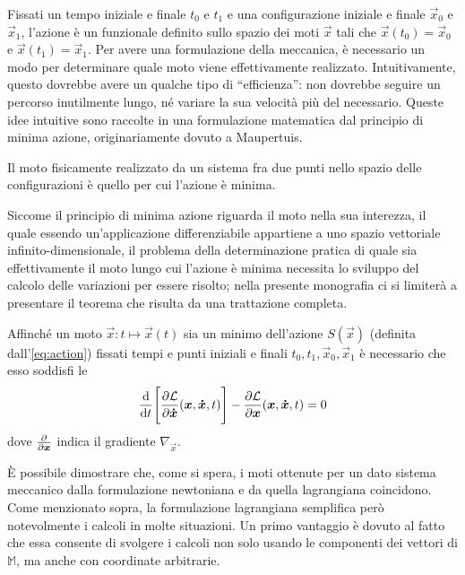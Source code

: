 Fissati un tempo iniziale e finale $t_0$ e $t_1$ e una configurazione iniziale e finale $\vec{x}_0$ e $\vec{x}_1$, l'azione è un funzionale definito sullo spazio dei moti $\vec{x}$ tali che $\vec{x}(t_0) = \vec{x}_0$ e $\vec{x}(t_1)=\vec{x}_1$. Per avere una formulazione della meccanica, è necessario un modo per determinare quale moto viene effettivamente realizzato. Intuitivamente, questo dovrebbe avere un qualche tipo di \textquotedblleft efficienza\textquotedblright: non dovrebbe seguire un percorso inutilmente lungo, né variare la sua velocità più del necessario. Queste idee intuitive sono raccolte in una formulazione matematica dal principio di minima azione, originariamente dovuto a Maupertuis.
\begin{minaction}
Il moto fisicamente realizzato da un sistema fra due punti nello spazio delle configurazioni è quello per cui l'azione è minima.
\end{minaction}
Siccome il principio di minima azione riguarda il moto nella sua interezza, il quale essendo un'applicazione differenziabile appartiene a uno spazio vettoriale infinito-dimensionale, il problema della determinazione pratica di quale sia effettivamente il moto lungo cui l'azione è minima necessita lo sviluppo del calcolo delle variazioni per essere risolto; nella presente monografia ci si limiterà a presentare il teorema che risulta da una trattazione completa.
\begin{theorem}
  Affinché un moto $\vec{x}: t\mapsto \vec{x}(t)$ sia un minimo dell'azione $S(\vec{x})$ (definita dall'\autoref{eq:action}) fissati tempi e punti iniziali e finali $t_0, t_1, \vec{x}_0, \vec{x}_1$ è necessario che esso soddisfi le  \begin{equation}
    \dv{t}\Bigg[\pdv{\mathcal{L}}{\boldsymbol{\dot{x}}}()(\boldsymbol{x}, \boldsymbol{\dot{x}}, t)\Bigg] - \pdv{\mathcal{L}}{\boldsymbol{x}}()(\boldsymbol{x}, \boldsymbol{\dot{x}}, t) = 0
  \end{equation} 
  dove $\pdv{\boldsymbol{x}}$ indica il gradiente $\nabla_{\vec{x}}$.
\end{theorem}

È possibile dimostrare che, come si spera, i moti ottenute per un dato sistema meccanico dalla formulazione newtoniana e da quella lagrangiana coincidono. Come menzionato sopra, la formulazione lagrangiana semplifica però notevolmente i calcoli in molte situazioni. Un primo vantaggio è dovuto al fatto che essa consente di svolgere i calcoli non solo usando le componenti dei vettori di $\mathbb{M}$, ma anche con coordinate arbitrarie.

